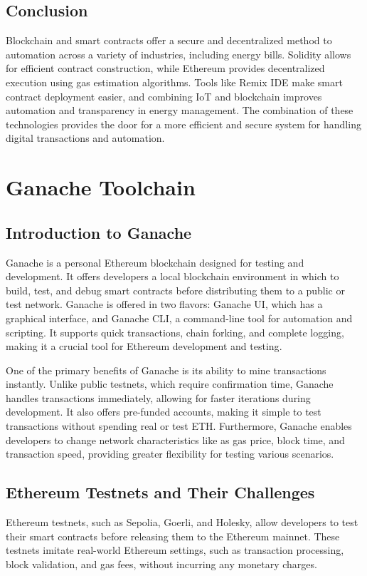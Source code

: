 \documentclass[a4paper,12pt]{report}
\begin{document}
 \section{Conclusion}
 Blockchain and smart contracts offer a secure and decentralized method to automation across a variety of industries, including energy bills.  Solidity allows for efficient contract construction, while Ethereum provides decentralized execution using gas estimation algorithms.  Tools like Remix IDE make smart contract deployment easier, and combining IoT and blockchain improves automation and transparency in energy management.  The combination of these technologies provides the door for a more efficient and secure system for handling digital transactions and automation.

  

 \chapter{Ganache Toolchain}

\section{Introduction to Ganache}
Ganache is a personal Ethereum blockchain designed for testing and development.  It offers developers a local blockchain environment in which to build, test, and debug smart contracts before distributing them to a public or test network\cite{brightwell2015overview}.  Ganache is offered in two flavors: Ganache UI, which has a graphical interface, and Ganache CLI, a command-line tool for automation and scripting\cite{gibson2016review}.  It supports quick transactions, chain forking, and complete logging, making it a crucial tool for Ethereum development and testing\cite{wang2017review}.

One of the primary benefits of Ganache is its ability to mine transactions instantly.  Unlike public testnets, which require confirmation time, Ganache handles transactions immediately, allowing for faster iterations during development.  It also offers pre-funded accounts, making it simple to test transactions without spending real or test ETH.  Furthermore, Ganache enables developers to change network characteristics like as gas price, block time, and transaction speed, providing greater flexibility for testing various scenarios.

\section{Ethereum Testnets and Their Challenges}
Ethereum testnets, such as Sepolia, Goerli, and Holesky, allow developers to test their smart contracts before releasing them to the Ethereum mainnet.  These testnets imitate real-world Ethereum settings, such as transaction processing, block validation, and gas fees, without incurring any monetary charges.
\end{document}
